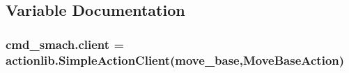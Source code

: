 \subsection{Variable Documentation}
\subsubsection[{\texorpdfstring{client}{client}}]{\setlength{\rightskip}{0pt plus 5cm}cmd\+\_\+smach.\+client = actionlib.\+Simple\+Action\+Client(\textquotesingle{}move\+\_\+base\textquotesingle{},Move\+Base\+Action)}\hypertarget{namespacecmd__smach_a5ae7fbb4f70832fc2cf7cfb954d473d5}{}\label{namespacecmd__smach_a5ae7fbb4f70832fc2cf7cfb954d473d5}
